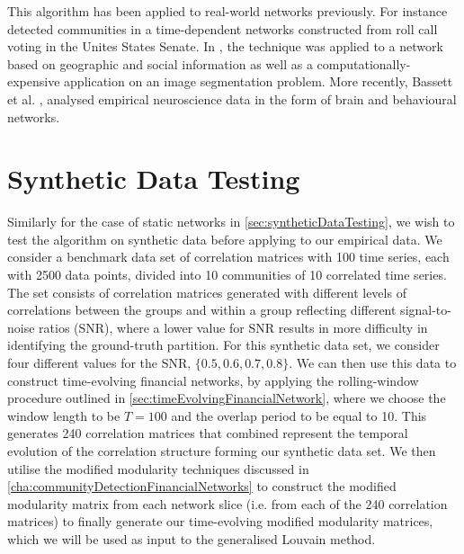 This algorithm has been applied to real-world networks previously.
For instance \cite{MRM+10} detected communities in a time-dependent networks constructed from roll call voting in the Unites States Senate.
In \cite{HGH+12}, the technique was applied to a network based on geographic and social information as well as a computationally-expensive application on an image segmentation problem.
More recently, Bassett et al. \cite{BPW+13}, analysed empirical neuroscience data in the form of brain and behavioural networks.


\section{Synthetic Data Testing}
\label{sec:temporalEvolutionSyntheticDataTesting}

Similarly for the case of static networks in \cref{sec:syntheticDataTesting}, we wish to test the algorithm on synthetic data before applying to our empirical data.
We consider a benchmark data set of correlation matrices with 100 time series, each with 2500 data points, divided into 10 communities of 10 correlated time series.
The set consists of correlation matrices generated with different levels of correlations between the groups and within a group reflecting different signal-to-noise ratios (SNR), where a lower value for SNR results in more difficulty in identifying the ground-truth partition.
For this synthetic data set, we consider four different values for the SNR, $\{0.5, 0.6, 0.7, 0.8\}$.
We can then use this data to construct time-evolving financial networks, by applying the rolling-window procedure outlined in \cref{sec:timeEvolvingFinancialNetwork}, where we choose the window length to be $T = 100$ and the overlap period to be equal to 10.
This generates 240 correlation matrices that combined represent the temporal evolution of the correlation structure forming our synthetic data set. 
We then utilise the modified modularity techniques discussed in \cref{cha:communityDetectionFinancialNetworks} to construct the modified modularity matrix from each network slice (i.e. from each of the 240 correlation matrices) to finally generate our time-evolving modified modularity matrices, which we will be used as input to the generalised Louvain method.

